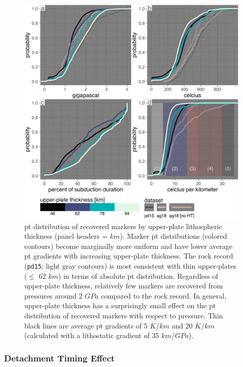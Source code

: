 \begin{figure}[htbp]

{\centering \includegraphics[width=1\linewidth,]{assets/figs/chpt4/z1100_cdf} 

}

\caption[Marker PT distribution by upper-plate thickness]{\gls{pt} distribution of recovered markers by upper-plate lithospheric thickness (panel headers = \(km\)). Marker \gls{pt} distributions (colored contours) become marginally more uniform and have lower average \gls{pt} gradients with increasing upper-plate thickness. The rock record (\texttt{pd15}; light gray contours) is most consistent with thin upper-plates (\(\leq\) 62 \(km\)) in terms of absolute \gls{pt} distribution. Regardless of upper-plate thickness, relatively few markers are recovered from pressures around 2 \(GPa\) compared to the rock record. In general, upper-plate thickness has a surprisingly small effect on the \gls{pt} distribution of recovered markers with respect to pressure. Thin black lines are average \gls{pt} gradients of 5 \(K/km\) and 20 \(K/km\) (calculated with a lithostatic gradient of 35 \(km/GPa\)).}\label{fig:zupDensity}
\end{figure}

\hypertarget{detachment-timing-effect}{%
\subsubsection{Detachment Timing Effect}\label{detachment-timing-effect}}

